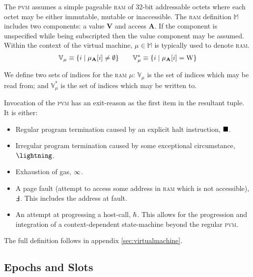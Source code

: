 The \textsc{pvm} assumes a simple pageable \textsc{ram} of 32-bit addressable octets where each octet may be either immutable, mutable or inaccessible. The \textsc{ram} definition $\mathbb{M}$ includes two components: a value $\mathbf{V}$ and access $\mathbf{A}$. If the component is unspecified while being subscripted then the value component may be assumed. Within the context of the virtual machine, $\mu \in \mathbb{M}$ is typically used to denote \textsc{ram}.
\begin{align}
  \mathbb{V}_{\mu} \equiv \{i \mid \mu_\mathbf{A}[i] \ne \emptyset \} \qquad
  \mathbb{V}^*_{\mu} \equiv \{i \mid \mu_\mathbf{A}[i] = \text{W} \}
\end{align}

We define two sets of indices for the \textsc{ram} $\mu$: $\mathbb{V}_{\mu}$ is the set of indices which may be read from; and $\mathbb{V}^*_{\mu}$ is the set of indices which may be written to.

Invocation of the \textsc{pvm} has an exit-reason as the first item in the resultant tuple. It is either:
\begin{itemize}
  \item Regular program termination caused by an explicit halt instruction, $\blacksquare$.
  \item Irregular program termination caused by some exceptional circumstance, $\panic$.
  \item Exhaustion of gas, $\infty$.
  \item A page fault (attempt to access some address in \textsc{ram} which is not accessible), $\fault$. This includes the address at fault.
  \item An attempt at progressing a host-call, $\hbar$. This allows for the progression and integration of a context-dependent state-machine beyond the regular \textsc{pvm}.
\end{itemize}

The full definition follows in appendix \ref{sec:virtualmachine}.

















\subsection{Epochs and Slots}\label{sec:epochsandslots}

